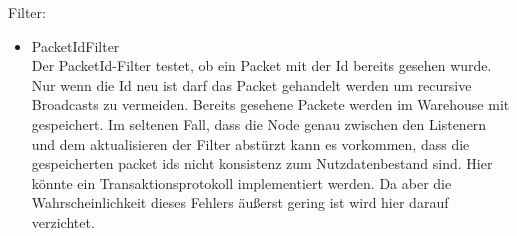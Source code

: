 \documentclass[a4paper]{article}
\theoremstyle{definition}
\begin{document}
    Filter:
    \begin{itemize}
        \item PacketIdFilter\\
            Der PacketId-Filter testet, ob ein Packet mit der Id bereits gesehen wurde. Nur wenn die Id neu ist darf das Packet gehandelt werden um recursive Broadcasts zu vermeiden. Bereits gesehene Packete werden im Warehouse mit gespeichert. Im seltenen Fall, dass die Node genau zwischen den Listenern und dem aktualisieren der Filter abstürzt kann es vorkommen, dass die gespeicherten packet ids nicht konsistenz zum Nutzdatenbestand sind. Hier könnte ein Transaktionsprotokoll implementiert werden. Da aber die Wahrscheinlichkeit dieses Fehlers äußerst gering ist wird hier darauf verzichtet.
    \end{itemize}
   
\end{document}
